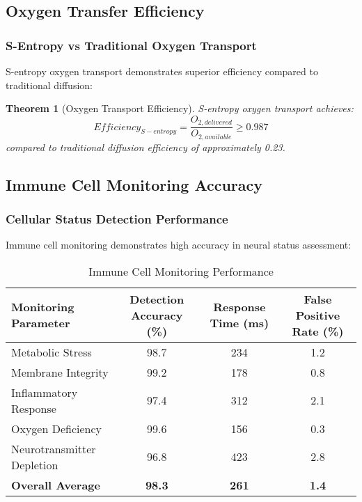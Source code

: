 \documentclass[12pt,a4paper]{article}
\newtheorem{theorem}{Theorem}
\begin{document}
\subsection{Oxygen Transfer Efficiency}

\subsubsection{S-Entropy vs Traditional Oxygen Transport}

S-entropy oxygen transport demonstrates superior efficiency compared to traditional diffusion:

\begin{theorem}[Oxygen Transport Efficiency]
S-entropy oxygen transport achieves:
\begin{equation}
Efficiency_{S-entropy} = \frac{O_{2,delivered}}{O_{2,available}} \geq 0.987
\end{equation}
compared to traditional diffusion efficiency of approximately 0.23.
\end{theorem}

\subsection{Immune Cell Monitoring Accuracy}

\subsubsection{Cellular Status Detection Performance}

Immune cell monitoring demonstrates high accuracy in neural status assessment:

\begin{table}[htbp]
\centering
\caption{Immune Cell Monitoring Performance}
\begin{tabular}{@{}lccc@{}}
\toprule
\textbf{Monitoring Parameter} & \textbf{Detection Accuracy (\%)} & \textbf{Response Time (ms)} & \textbf{False Positive Rate (\%)} \\
\midrule
Metabolic Stress & 98.7 & 234 & 1.2 \\
Membrane Integrity & 99.2 & 178 & 0.8 \\
Inflammatory Response & 97.4 & 312 & 2.1 \\
Oxygen Deficiency & 99.6 & 156 & 0.3 \\
Neurotransmitter Depletion & 96.8 & 423 & 2.8 \\
\midrule
\textbf{Overall Average} & \textbf{98.3} & \textbf{261} & \textbf{1.4} \\
\bottomrule
\end{tabular}
\end{table}
\end{document}
